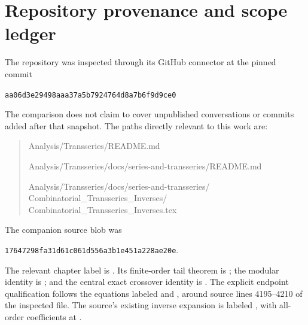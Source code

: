 \documentclass[11pt,a4paper]{article}
\numberwithin{equation}{section}
\theoremstyle{definition}
\newcommand{\snap}{\texttt{aa06d3e29498aaa37a5b7924764d8a7b6f9d9ce0}}
\begin{document}
\appendix
\section{Repository provenance and scope ledger}
\label{app:provenance}

The repository was inspected through its GitHub connector at the pinned commit
\begin{center}\small\snap\end{center}
The comparison does not claim to cover unpublished conversations or commits added after that snapshot. The paths directly relevant to this work are:
\begin{quote}\small\ttfamily\raggedright
Analysis/Transseries/README.md\par
Analysis/Transseries/docs/series-and-transseries/README.md\par
Analysis/Transseries/docs/series-and-transseries/\allowbreak
Combinatorial\_Transseries\_Inverses/\allowbreak
Combinatorial\_Transseries\_Inverses.tex
\end{quote}
The companion source blob was
\begin{center}\small\texttt{17647298fa31d61c061d556a3b1e451a228ae20e}.\end{center}
The relevant chapter label is . Its finite-order tail theorem is ; the modular identity is ; and the central exact crossover identity is . The explicit endpoint qualification follows the equations labeled  and , around source lines 4195--4210 of the inspected file. The source's existing inverse expansion is labeled , with all-order coefficients at .
\end{document}
